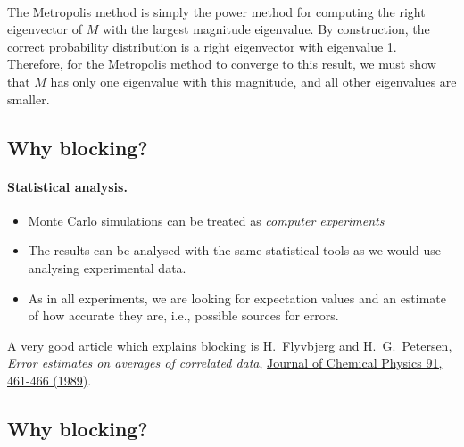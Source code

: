 \documentclass[%
twoside,                 %
final,                   %
10pt]{article}
\begin{document}
\paragraph{}
The Metropolis method is simply the power method for computing the
right eigenvector of $M$ with the largest magnitude eigenvalue.
By construction, the correct probability distribution is a right eigenvector
with eigenvalue 1. Therefore, for the Metropolis method to converge
to this result, we must show that $M$ has only one eigenvalue with this
magnitude, and all other eigenvalues are smaller.




\subsection*{Why blocking?}

\paragraph{Statistical analysis.}
\begin{itemize}
    \item Monte Carlo simulations can be treated as \emph{computer experiments}

    \item The results can be analysed with the same statistical tools as we would use analysing experimental data.

    \item As in all experiments, we are looking for expectation values and an estimate of how accurate they are, i.e., possible sources for errors.
\end{itemize}

\noindent
A very good article which explains blocking is H.~Flyvbjerg and H.~G.~Petersen, \emph{Error estimates on averages of correlated data},  \href{{http://scitation.aip.org/content/aip/journal/jcp/91/1/10.1063/1.457480}}{Journal of Chemical Physics 91, 461-466 (1989)}.

    

\subsection*{Why blocking?}

\end{document}
